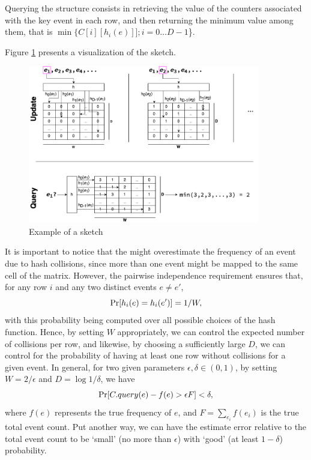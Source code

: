 Querying the structure consists in retrieving the value of the counters associated with the key event in each row,  and then returning
the minimum value among them, that is $\min\{C[i][h_i(e)]]; i=0\ldots D-1$\}.


Figure \ref{fig:countminexample} presents a visualization of the \cm sketch.

\begin{figure}[htbp]
	\begin{center}
    \includegraphics[width=0.9\textwidth]{figures/cm-example}
	\end{center}
	\caption{Example of a \cm sketch}\label{fig:countminexample}
\end{figure}

It is important to notice that the \cm might overestimate the frequency of an event due to hash collisions, since more than one event might be mapped to the same cell of the matrix. However, the pairwise independence requirement ensures that, for any row $i$ and any two distinct events $e\neq e'$,
\begin{equation*}
\mathrm{Pr}[h_i(e)=h_i(e')] = 1/W,
\end{equation*}
with this probability being computed over all possible choices of the hash function.
Hence, by setting $W$ appropriately, we can control the expected number of collisions per row, and likewise, by choosing a sufficiently large $D$, we can control for the probability of having at least one row without collisions for a given event. In general, for two given parameters $\epsilon, \delta \in (0,1)$, by setting 
$W=2/\epsilon$ and $D=\log1/\delta$, we have
\begin{equation*}
\mathrm{Pr}[C.query(e) - f(e) > \epsilon F] < \delta,
\end{equation*}
where $f(e)$ represents the true frequency of $e$, and $F=\sum_{e_i}f(e_i)$ is the true total event count. Put another way, we can have the estimate error relative to the total event count to be `small' (no more than $\epsilon$) with `good' (at least $1-\delta$) probability.

